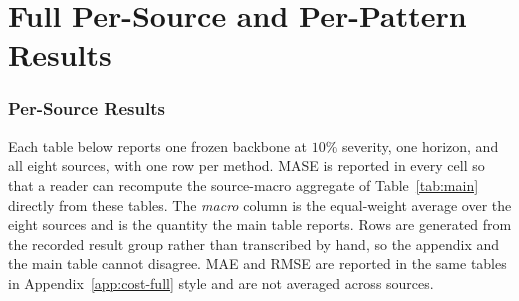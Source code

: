 \documentclass{article}
\begin{document}
\begin{table}[h]
  \caption{Governance contract by input regime. The complete-input rows are contract
  statements and not accuracy results. The expected behaviour there is a no-op, and a non-no-op
  would be a defect rather than an improvement.}
  \label{tab:app-complete}
  \centering
  \small
  \setlength{\tabcolsep}{4pt}
\end{table}


\section{Full Per-Source and Per-Pattern Results}
\label{app:full-results}
\subsubsection{Per-Source Results}
\label{app:datasets}
Each table below reports one frozen backbone at $10\%$ severity, one horizon, and
all eight sources, with one row per method. MASE is reported in every cell so that a
reader can recompute the source-macro aggregate of Table~\ref{tab:main} directly from
these tables. The \emph{macro} column is the equal-weight average over the eight sources
and is the quantity the main table reports. Rows are generated from the recorded result
group rather than transcribed by hand, so the appendix and the main table cannot disagree.
MAE and RMSE are reported in the same tables in Appendix~\ref{app:cost-full} style and
are not averaged across sources.
\end{document}
